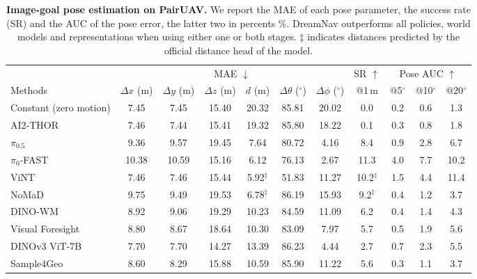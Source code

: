 \begin{table}[!t]
    \centering
    \caption{\textbf{Image-goal pose estimation on PairUAV.} We report the MAE of each pose parameter, the success rate (SR) and the AUC of the pose error, the latter two in percents \%. DreamNav outperforms all policies, world models and representations when using either one or both stages. $\ddagger$ indicates distances predicted by the official distance head of the model.}
    \label{tab:main_result}
    \small
    \setlength{\tabcolsep}{4.2pt}
    \begin{tabular}{l|cccccc|c|ccc}
        \toprule
        & \multicolumn{6}{c|}{MAE $\downarrow$} & SR $\uparrow$ & \multicolumn{3}{c}{Pose AUC $\uparrow$} \\
        Methods & $\Delta x$ (m) & $\Delta y$ (m) & $\Delta z$ (m) & $d$ (m) & $\Delta\theta$ ($^\circ$) & $\Delta\phi$ ($^\circ$) & @1\,m & @5$^\circ$ & @10$^\circ$ & @20$^\circ$ \\
        \midrule
        Constant (zero motion) & 7.45 & 7.45 & 15.40 & 20.32 & 85.81 & 20.02 & 0.0 & 0.2 & 0.6 & 1.3 \\
        \midrule
        AI2-THOR~\citep{7989381} & 7.46 & 7.44 & 15.41 & 19.32 & 85.80 & 18.22 & 0.1 & 0.3 & 0.8 & 1.8 \\
        $\pi_{0.5}$~\citep{intelligence2025pi_} & 9.36 & 9.57 & 19.45 & 7.64 & 80.72 & 4.16 & 8.4 & 0.9 & 2.8 & 6.7 \\
        $\pi_0$-FAST~\citep{pertsch2025fast} & 10.38 & 10.59 & 15.16 & 6.12 & 76.13 & 2.67 & 11.3 & 4.0 & 7.7 & 10.2 \\
        ViNT~\citep{shah2023vint} & 7.46 & 7.46 & 15.44 & 5.92$^\ddagger$ & 51.83 & 11.27 & 10.2$^\ddagger$ & 1.5 & 4.4 & 11.4 \\
        NoMaD~\citep{sridhar2024nomad} & 9.75 & 9.49 & 19.53 & 6.78$^\ddagger$ & 86.19 & 15.93 & 9.2$^\ddagger$ & 0.4 & 1.2 & 3.7 \\
        DINO-WM~\citep{zhou2025dinowm} & 8.92 & 9.06 & 19.29 & 10.23 & 84.59 & 11.09 & 6.2 & 0.4 & 1.4 & 4.3 \\
        Visual Foresight~\citep{ebert2018visual} & 8.80 & 8.67 & 18.64 & 10.30 & 83.09 & 7.97 & 5.7 & 0.5 & 1.9 & 5.6 \\
        DINOv3 ViT-7B~\citep{simeoni2025dinov3} & 7.70 & 7.70 & 14.27 & 13.39 & 86.23 & 4.44 & 2.7 & 0.7 & 2.3 & 5.5 \\
        Sample4Geo~\citep{deuser2023sample4geo} & 8.60 & 8.29 & 15.88 & 10.59 & 85.90 & 11.22 & 5.6 & 0.3 & 1.1 & 3.7 \\

\end{tabular}
\end{table}
